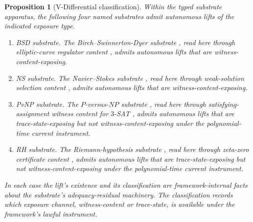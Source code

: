 \documentclass[11pt]{article}
\newtheorem{proposition}[theorem]{Proposition}
\theoremstyle{definition}
\begin{document}
\begin{proposition}[V-Differential classification]
\label{prop:v-differential}
Within the typed substrate apparatus, the following four named
substrates admit autonomous lifts of the indicated exposure type.
\begin{enumerate}
  \item \emph{BSD substrate.}  The Birch--Swinnerton-Dyer substrate
  \citep{BirchSwinnertonDyer1965NotesII}, read here through
  elliptic-curve regulator content
  \citep{Silverman2009ArithmeticEllipticCurves}, admits autonomous
  lifts that are witness-content-exposing.

  \item \emph{NS substrate.}  The Navier--Stokes substrate
  \citep{Fefferman2006NavierStokesClay}, read here through
  weak-solution selection content \citep{Leray1934LiquideVisqueux},
  admits autonomous lifts that are witness-content-exposing.

  \item \emph{PvNP substrate.}  The \(P\)-versus-\(NP\) substrate
  \citep{Cook2000PNPClay}, read here through satisfying-assignment
  witness content for \(3\)-SAT \citep{Cook1971TheoremProving}, admits
  autonomous lifts that are trace-state-exposing but not
  witness-content-exposing under the polynomial-time current instrument.

  \item \emph{RH substrate.}  The Riemann-hypothesis substrate
  \citep{Bombieri2000RiemannClay}, read here through zeta-zero
  certificate content \citep{Conrey2003RiemannHypothesis}, admits
  autonomous lifts that are trace-state-exposing but not
  witness-content-exposing under the polynomial-time current instrument.
\end{enumerate}
In each case the lift's existence and its classification are
framework-internal facts about the substrate's adequacy-residual
machinery.  The classification records which exposure channel,
witness-content or trace-state, is available under the framework's
lawful instrument.
\end{proposition}
\end{document}
